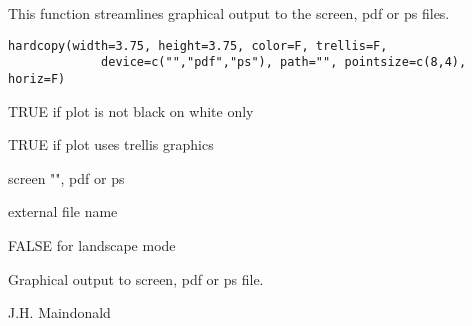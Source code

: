 \begin{Description}\relax
This function streamlines graphical output to the screen,
pdf or ps files.
\end{Description}
\begin{Usage}
\begin{verbatim}
hardcopy(width=3.75, height=3.75, color=F, trellis=F,
             device=c("","pdf","ps"), path="", pointsize=c(8,4), horiz=F)
\end{verbatim}
\end{Usage}
\begin{Arguments}
\begin{ldescription}
\item[\code{width}] 
\item[\code{height}] 
\item[\code{color}] TRUE if plot is not black on white only
\item[\code{trellis}] TRUE if plot uses trellis graphics
\item[\code{device}] screen "", pdf or ps
\item[\code{path}] external file name
\item[\code{pointsize}] 
\item[\code{horiz}] FALSE for landscape mode
\end{ldescription}
\end{Arguments}
\begin{Value}
Graphical output to screen, pdf or ps file.
\end{Value}
\begin{Author}\relax
J.H. Maindonald
\end{Author}
\begin{SeeAlso}\relax
{}
\end{SeeAlso}

